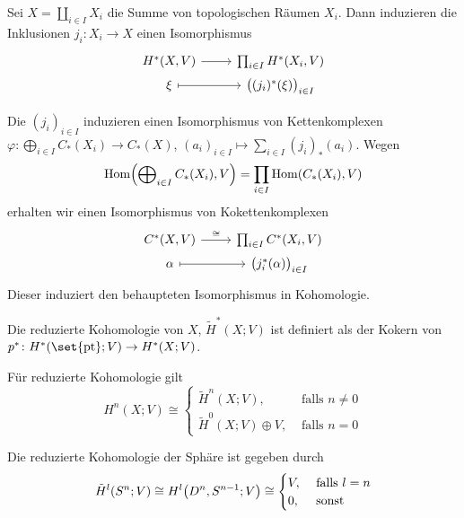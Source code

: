 \begin{satz}
	Sei $X= \coprod_{i \in I} X_i$ die Summe von topologischen Räumen $X_i$. Dann induzieren die Inklusionen $j_i \colon X_i \to X$ einen Isomorphismus 
	\[
		\begin{tikzcd}[row sep=0em]
			H^* \enbrace*{X,V} \rar & \prod_{i \in I} H^*(X_i,V) \\
			\xi \rar[mapsto] & \enbrace[\big]{(j_i)^*(\xi)}_{i \in I}
		\end{tikzcd}
	\]
\end{satz}
\begin{beweis}
	Die $(j_i)_{i \in I}$ induzieren einen Isomorphismus von Kettenkomplexen $\varphi \colon \bigoplus_{i \in I}C_*(X_i) \to C_*(X)$,  
	$(a_i)_{i \in I} \mapsto \sum_{i \in I} (j_i)_* (a_i)$. Wegen 
	\[
		\Hom \enbrace*{\bigoplus\nolimits_{i \in I} C_*(X_i),V} = \prod_{i \in I} \Hom \enbrace*{C_*(X_i),V}
	\]
	erhalten wir einen Isomorphismus von Kokettenkomplexen
	\[
		\begin{tikzcd}[row sep=0em]
			C^*(X,V) \rar["\cong"] & \prod_{i \in I} C^*(X_i,V) \\
			\alpha \rar[mapsto] & \enbrace[\big]{j_i^*(\alpha)}_{i \in I}
		\end{tikzcd}
	\]
	Dieser induziert den behaupteten Isomorphismus in Kohomologie.  
\end{beweis}

\begin{definition}[{name=[reduzierte Kohomologie]}]
	Die reduzierte Kohomologie von $X$, $\tilde{H}^*(X;V)$ ist definiert als der Kokern von $p^* \colon H^* \enbrace*{\set{\pt};V} \to H^*(X;V)$.
\end{definition}

\begin{bemerkung}[{name=[Zusammenhang zwischen reduzierter und regulärer Homologie]}]
	Für reduzierte Kohomologie gilt
	\[
		H^n(X;V) \cong \begin{cases}
			\tilde{H}^n(X;V), &\text{ falls } n \not= 0\\
			\tilde{H}^0(X;V) \oplus V , &\text{ falls } n=0 
		\end{cases}
	\]
\end{bemerkung}

\begin{beispiel}[{name=[Kohomologie der Sphäre]}]
	Die reduzierte Kohomologie der Sphäre ist gegeben durch
	\[
		\tilde{H}^l (S^n;V) \cong H^l \enbrace*{D^n,S^{n-1};V} \cong \begin{cases}
			V, &\text{ falls } l=n\\
			0, &\text{ sonst}  
		\end{cases}
	\]
\end{beispiel}
\newpage

